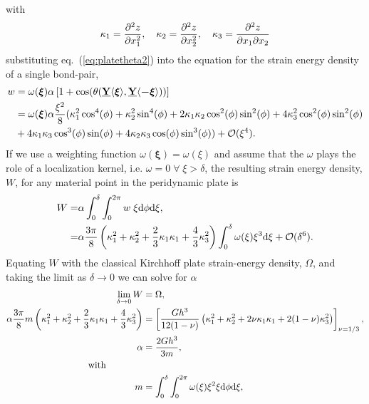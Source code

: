 %
with
%
\begin{equation}
    \kappa_1=\frac{\partial^2 z}{\partial x_1^2}, \quad \kappa_2= \frac{\partial^2 z}{\partial x_2^2}, \quad \kappa_3=\frac{\partial^2 z}{\partial x_1\partial x_2}\notag
\end{equation}
%
substituting eq.~(\ref{eq:platetheta2}) into the equation for the strain energy density of a single bond-pair,
%
\begin{align}
    w &= \omega(\boldsymbol{\xi}) \alpha \left[1+\cos(\theta(\vstate{Y}{}{\boldsymbol{\xi}},\vstate{Y}{}{\boldsymbol{-\xi}}) ) \right] \notag \\
    &= \omega(\boldsymbol{\xi}) \alpha\frac{\xi^2}{8}(\kappa_1^2\cos^4(\phi)+\kappa_2^2\sin^4(\phi)+2\kappa_1\kappa_2\cos^2(\phi)\sin^2(\phi)+4\kappa_3^2\cos^2(\phi)\sin^2(\phi) \notag \\
    &+ 4\kappa_1\kappa_3\cos^3(\phi)\sin(\phi)+4\kappa_2\kappa_3\cos(\phi)\sin^3(\phi))+\mathcal{O}(\xi^4).\notag
\end{align}
%
If we use a weighting function \(\omega(\boldsymbol{\xi})=\omega(\xi)\) and assume that the $\omega$ plays the role of a localization kernel, i.e. $\omega = 0 \; \forall \; \xi > \delta$, the resulting strain energy density, $W$, for any material point in the peridynamic plate is
%
\begin{align}
    W =& \alpha \int_{0}^\delta\int_0^{2 \pi} w\; \xi {\rm d}\phi {\rm d}\xi ,\notag \\
    =& \alpha \frac{3\pi}{8} \left(\kappa_1^2+\kappa_2^2+\frac{2}{3}\kappa_1\kappa_1+\frac{4}{3}\kappa_3^2 \right)\int_{0}^\delta \omega(\xi)\xi^3{\rm d}\xi + \mathcal{O}(\delta^6).\notag 
\end{align}
%
Equating $W$ with the classical Kirchhoff plate strain-energy density, $\Omega$, and taking the limit as $\delta \to 0$ we can solve for $\alpha$
%
\begin{align}
    \lim_{\delta \to 0}  W &= \Omega, \notag \\
    \alpha \frac{3 \pi}{8} m \left(\kappa_1^2+\kappa_2^2+\frac{2}{3}\kappa_1\kappa_1+\frac{4}{3}\kappa_3^2 \right)&= \left[ \frac{G h^3}{12(1-\nu)} \left(\kappa_1^2+\kappa_2^2+2\nu\kappa_1\kappa_1+2(1-\nu)\kappa_3^2 \right) \right]_{\nu=1/3}, \notag \\
    \alpha &= \frac{2 G h^3}{3 m}, \\
    \text{with}\qquad \qquad \notag \\
    m &= \int_{0}^{\delta} \int_{0}^{2\pi}\omega(\xi) \xi^2 \xi {\rm d}\phi {\rm d}\xi \notag,
\end{align}
